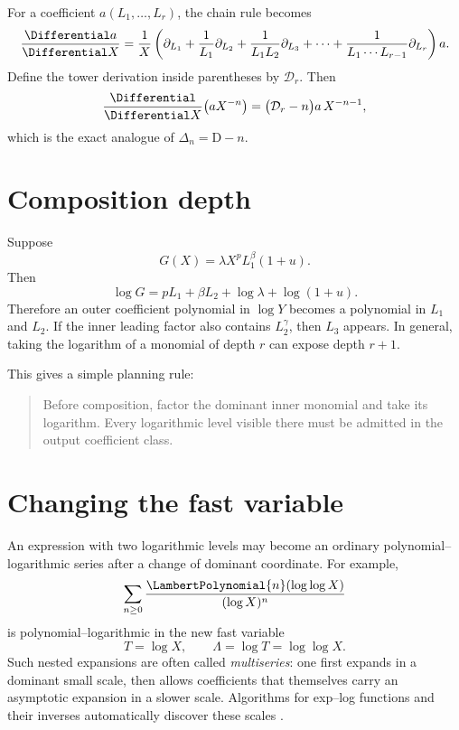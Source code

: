 \documentclass[11pt,openany]{book}
\theoremstyle{definition}
\theoremstyle{plain}
\theoremstyle{remark}
\newcommand{\Dop}{\mathrm{D}}
\begin{document}
For a coefficient \(a(L_1,\ldots,L_r)\), the chain rule becomes
\begin{equation}\label{eq:tower-chain-operator}
 \frac{\Differential a}{\Differential X}
 =\frac1X\left(
 \partial_{L_1}
 +\frac1{L_1}\partial_{L_2}
 +\frac1{L_1L_2}\partial_{L_3}
 +\cdots
 +\frac1{L_1\cdots L_{r-1}}\partial_{L_r}
 \right)a.
\end{equation}
Define the tower derivation inside parentheses by \(\mathcal D_r\).  Then
\[
 \frac{\Differential}{\Differential X}\bigl(aX^{-n}\bigr)
 =\bigl(\mathcal D_r-n\bigr)a\,X^{-n-1},
\]
which is the exact analogue of \(\Delta_n=\Dop-n\).

\section{Composition depth}
Suppose
\[
 G(X)=\lambda X^pL_1^\beta(1+u).
\]
Then
\[
 \log G=pL_1+\beta L_2+\log\lambda+\log(1+u).
\]
Therefore an outer coefficient polynomial in \(\log Y\) becomes a polynomial in
\(L_1\) and \(L_2\).  If the inner leading factor also contains \(L_2^\gamma\),
then \(L_3\) appears.  In general, taking the logarithm of a monomial of depth
\(r\) can expose depth \(r+1\).

This gives a simple planning rule:
\begin{quote}
Before composition, factor the dominant inner monomial and take its logarithm.
Every logarithmic level visible there must be admitted in the output
coefficient class.
\end{quote}

\section{Changing the fast variable}
An expression with two logarithmic levels may become an ordinary
polynomial--logarithmic series after a change of dominant coordinate.  For
example,
\begin{equation}\label{eq:multiseries-form}
 \sum_{n\ge0}\frac{\LambertPolynomial{n}(\log\log X)}{(\log X)^n}
\end{equation}
is polynomial--logarithmic in the new fast variable
\[
 T=\log X,
 \qquad \Lambda=\log T=\log\log X.
\]
Such nested expansions are often called \emph{multiseries}: one first expands
in a dominant small scale, then allows coefficients that themselves carry an
asymptotic expansion in a slower scale.  Algorithms for exp--log functions and
their inverses automatically discover these scales
\cite{rssv-exp-log,salvy-shackell}.
\end{document}
